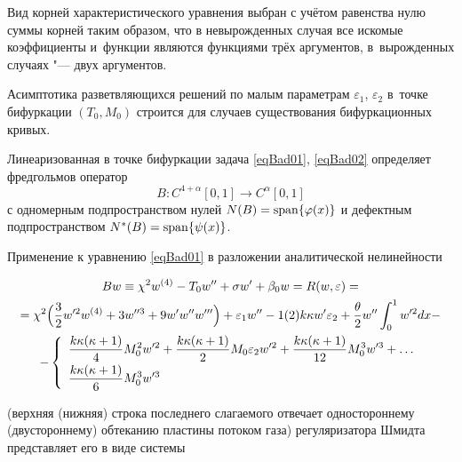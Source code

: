 Вид корней характеристического уравнения выбран с учётом равенства нулю суммы корней таким образом, что в невырожденных случая все искомые коэффициенты и~функции являются функциями трёх аргументов, в~вырожденных случаях "--- двух аргументов.



Асимптотика разветвляющихся решений по малым параметрам $\varepsilon_1$, $\varepsilon_2$ в~точке бифуркации $(T_0, M_0)$ строится для случаев существования бифуркационных кривых.



Линеаризованная в точке бифуркации задача \eqref{eqBad01}, \eqref{eqBad02} определяет фредгольмов оператор $$B: C^{4+\alpha}[0, 1]\to C^{\alpha}[0, 1]$$ с одномерным подпространством нулей $N(B)=\mathop{\rm span}\{\varphi(x)\}$ и дефектным подпространством $N^{\ast}(B)=\mathop{\rm span}\{\psi(x)\}$.

Применение к уравнению \eqref{eqBad01} в разложении аналитической нелинейности

\begin{multline*}

  B w\equiv\chi^2 w^{(4)}-T_0 w''+\sigma w'+\beta_{0} w =  R(w,\varepsilon)=  \\ 

  = \chi^2 \Bigl(\frac{3}{2}w'^2w^{(4)}+3w''^3+9w'w''w'''\Bigr)

  +\varepsilon_1 w''-1(2)k\kappa w'\varepsilon_2+\frac{\theta}{2}w''\int_0^1 w'^2dx-\\

  -\left\{\begin{array}{l}

  \displaystyle

    \frac{k\kappa(\kappa+1)}{4}M_0^2w'^2+\frac{k\kappa(\kappa+1)}{2}M_0\varepsilon_2w'^2+\frac{k\kappa(\kappa+1)}{12}M_0^3w'^3+\ldots\\[2mm]

      \displaystyle

    \frac{k\kappa(\kappa+1)}{6}M_0^3w'^3

    \end{array}

    \right.

\end{multline*}

(верхняя (нижняя) строка последнего слагаемого  отвечает одностороннему (двустороннему) обтеканию пластины потоком газа) регуляризатора Шмидта~\cite{badokinate:bib:VAT} представляет его в виде системы 

